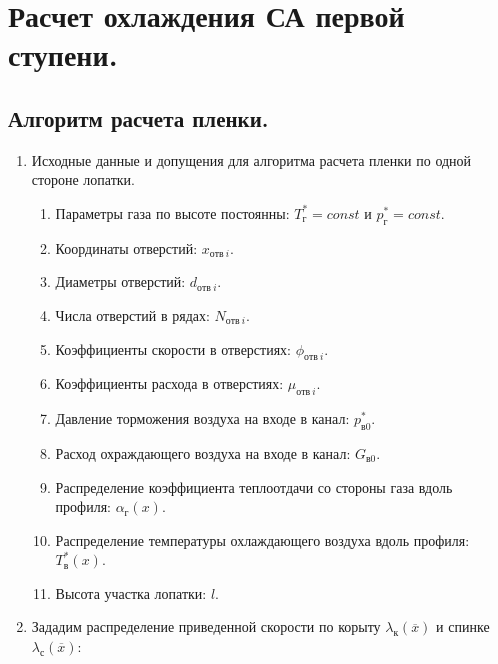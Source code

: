 \documentclass[a4paper,10pt]{article}
\begin{document}
\section{Расчет охлаждения СА первой ступени.}

    

    \subsection{Алгоритм расчета пленки.}

    

    \begin{enumerate}

        \item Исходные данные и допущения для алгоритма расчета пленки по одной стороне лопатки.

        \begin{enumerate}

            \item Параметры газа по высоте постоянны: $T_г^* = const$ и $p_г^* = const$.
            \item Координаты отверстий: $x_{отв\ i}$.
            \item Диаметры отверстий: $d_{отв\ i}$.
            \item Числа отверстий в рядах: $N_{отв\ i}$.
            \item Коэффициенты скорости в отверстиях: $\phi_{отв\ i}$.
            \item Коэффициенты расхода в отверстиях: $\mu_{отв\ i}$.
            \item Давление торможения воздуха на входе в канал: $p_{в0}^*$.
            \item Расход охраждающего воздуха на входе в канал: $G_{в0}$.
            \item Распределение коэффициента теплоотдачи со стороны газа вдоль профиля: $\alpha_г (x)$.
            \item Распределение температуры охлаждающего воздуха вдоль профиля: $T_в^* (x)$.
            \item Высота участка лопатки: $l$.

        \end{enumerate}

        \item Зададим распределение приведенной скорости по корыту $\lambda_к \left( \overline{x} \right)$ и
        спинке $\lambda_с \left( \overline{x} \right)$:


\end{enumerate}
\end{document}

